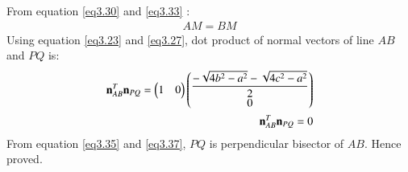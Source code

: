 \documentclass[journal,12pt,twocolumn]{IEEEtran}
\begin{document}
From equation \ref{eq3.30} and \ref{eq3.33} :
\begin{align}
    AM=BM \label{eq3.35}
\end{align}
Using equation \ref{eq3.23} and \ref{eq3.27}, dot product of normal vectors of line $AB$ and $PQ$ is:
\begin{align}
    \mathbf{n}_{AB}^T\mathbf{n}_{PQ}=\begin{pmatrix}1&0\end{pmatrix}\begin{pmatrix}\displaystyle \frac{-\sqrt{4b^2-a^2}-\sqrt{4c^2-a^2}}{2}\\0\end{pmatrix}\\
    \mathbf{n}_{AB}^T\mathbf{n}_{PQ}=0 \label{eq3.37}
\end{align}
From equation \ref{eq3.35} and \ref{eq3.37}, $PQ$ is perpendicular bisector of $AB$. Hence proved.
\end{document}
